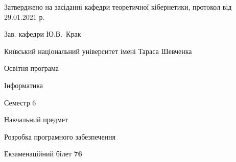 \documentclass[10pt, ukrainian]{article}
\begin{document}
{\vspace{5mm}\smallskip \begin {small} Затверджено на засіданні кафедри теоретичної кібернетики, протокол  від   29.01.2021 р.\par\smallskip\smallskip
{\parbox {6.5 cm}{Зав. кафедри \dotfill Ю.В.~Крак}} \end{small}}
\newpage

{{\begin {small}\par
{ \center  Київський національний університет імені Тараса Шевченка \par}
{\parbox {5 cm}{Освітня програма \hfill}{\parbox {7 cm}{Інформатика \hfill}}\parbox {6 cm}{\hfill Семестр 6}}\par
{\parbox {5 cm} {Навчальний предмет \hfill}\parbox {7 cm}{Розробка програмного забезпечення \hfill}\parbox {6cm}{\hfill}\par}\vspace{-7pt} \end{small}}{\center Екзаменаційний білет \No \textbf
{ 76 }\par}}
\end{document}
